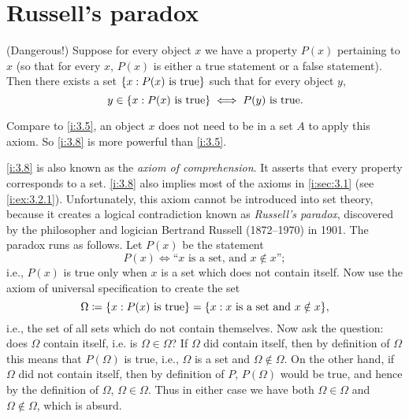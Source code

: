 \section{Russell's paradox}\label{i:sec:3.2}

\begin{ax}\label{i:3.8}
  (Dangerous!)
  Suppose for every object \(x\) we have a property \(P(x)\) pertaining to \(x\) (so that for every \(x\), \(P(x)\) is either a true statement or a false statement).
  Then there exists a set \(\left\lbrace x : P(x) \text{ is true}\right\rbrace\) such that for every object \(y\),
  \[
    y \in \left\lbrace x : P(x) \text{ is true}\right\rbrace \iff P(y) \text{ is true}.
  \]
\end{ax}

\begin{note}
  Compare to \cref{i:3.5}, an object \(x\) does not need to be in a set \(A\) to apply this axiom.
  So \cref{i:3.8} is more powerful than \cref{i:3.5}.
\end{note}

\begin{note}
  \cref{i:3.8} is also known as the \emph{axiom of comprehension}.
  It asserts that every property corresponds to a set.
  \cref{i:3.8} also implies most of the axioms in \cref{i:sec:3.1} (see \cref{i:ex:3.2.1}).
  Unfortunately, this axiom cannot be introduced into set theory, because it creates a logical contradiction known as \emph{Russell's paradox}, discovered by the philosopher and logician Bertrand Russell (1872--1970) in 1901.
  The paradox runs as follows.
  Let \(P(x)\) be the statement
  \[
    P(x) \iff \text{``\(x\) is a set, and \(x \notin x\)''};
  \]
  i.e., \(P(x)\) is true only when \(x\) is a set which does not contain itself.
  Now use the axiom of universal specification to create the set
  \[
    \Omega \coloneqq \set{x : P(x) \text{ is true}} = \set{x : x \text{ is a set and } x \notin x},
  \]
  i.e., the set of all sets which do not contain themselves.
  Now ask the question: does \(\Omega\) contain itself, i.e. is \(\Omega \in \Omega\)?
  If \(\Omega\) did contain itself, then by definition of \(\Omega\) this means that \(P(\Omega)\) is true, i.e., \(\Omega\) is a set and \(\Omega \notin \Omega\).
  On the other hand, if \(\Omega\) did not contain itself, then by definition of \(P\), \(P(\Omega)\) would be true, and hence by the definition of \(\Omega\), \(\Omega \in \Omega\).
  Thus in either case we have both \(\Omega \in \Omega\) and \(\Omega \notin \Omega\), which is absurd.
\end{note}

